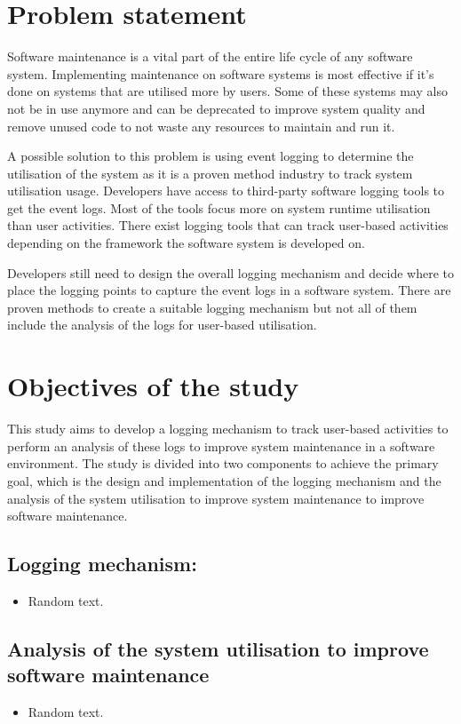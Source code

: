 \section{Problem statement}
Software maintenance is a vital part of the entire life cycle of any software system. Implementing maintenance on software systems is most effective if it's done on systems that are utilised more by users. Some of these systems may also not be in use anymore and can be deprecated to improve system quality and remove unused code to not waste any resources to maintain and run it.\par A possible solution to this problem is using event logging to determine the utilisation of the system as it is a proven method industry to track system utilisation usage. Developers have access to third-party software logging tools to get the event logs. Most of the tools focus more on system runtime utilisation than user activities. There exist logging tools that can track user-based activities depending on the framework the software system is developed on.\par Developers still need to design the overall logging mechanism and decide where to place the logging points to capture the event logs in a software system. There are proven methods to create a suitable logging mechanism but not all of them include the analysis of the logs for user-based utilisation.

\section{Objectives of the study}
This study aims to develop a logging mechanism to track user-based activities to perform an analysis of these logs to improve system maintenance in a software environment. The study is divided into two components to achieve the primary goal, which is the design and implementation of the logging mechanism and the analysis of the system utilisation to improve system maintenance to improve software maintenance.

\subsection{Logging mechanism:}
\begin{itemize}
	\item Random text.
\end{itemize}

\subsection{Analysis of the system utilisation to improve software maintenance}
\begin{itemize}
	\item Random text.
\end{itemize}

